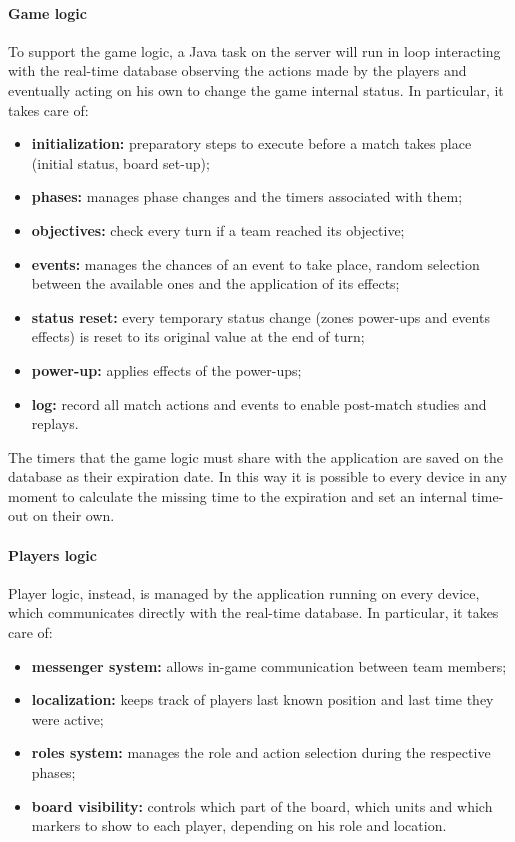 			\newpage
			
			\paragraph{Game logic}
			
				To support the game logic, a Java task on the server will run in loop interacting with the real-time database observing the actions made by the players and eventually acting on his own to change the game internal status. In particular, it takes care of:
				\begin{itemize}
					\item \textbf{initialization:} preparatory steps to execute before a match takes place (initial status, board set-up);
					\item \textbf{phases:} manages phase changes and the timers associated with them;
					\item \textbf{objectives:} check every turn if a team reached its objective;
					\item \textbf{events:} manages the chances of an event to take place,  random selection between the available ones and the application of its effects;
					\item \textbf{status reset:} every temporary status change (zones power-ups and events effects) is reset to its original value at the end of turn;
					\item \textbf{power-up:} applies effects of the power-ups;
					\item \textbf{log:} record all match actions and events to enable post-match studies and replays.  
				\end{itemize}
				
				The timers that the game logic must share with the application are saved on the database as their expiration date. In this way it is possible to every device in any moment to calculate the missing time to the expiration and set an internal time-out on their own.
			
			\paragraph{Players logic}
			
				Player logic, instead, is managed by the application running on every device, which communicates directly with the real-time database. In particular, it takes care of:
				\begin{itemize}
					\item \textbf{messenger system:} allows in-game communication between team members;
					\item \textbf{localization:} keeps track of players last known position and last time they were active;
					\item \textbf{roles system:} manages the role and action selection during the respective phases;
					\item \textbf{board visibility:} controls which part of the board, which units and which markers to show to each player, depending on his role and location.
				\end{itemize}
			
